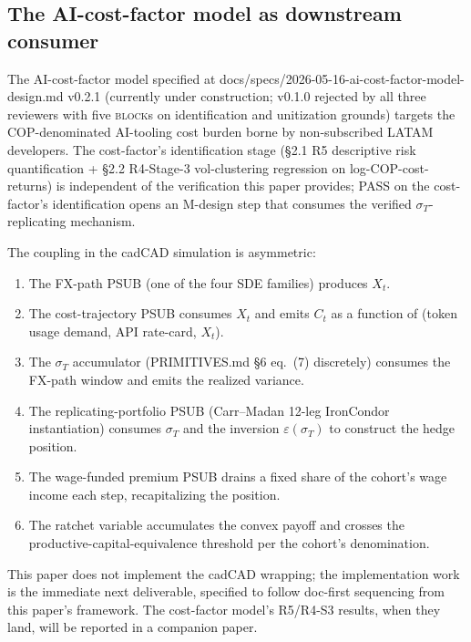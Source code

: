 \documentclass[11pt,letterpaper]{article}
\newcommand{\sigmaT}{\sigma_{T}}
\newcommand{\epsT}{\varepsilon(\sigmaT)}
\begin{document}
\subsection{The AI-cost-factor model as downstream consumer}
\label{sec:cadcad:cost-factor}

The AI-cost-factor model specified at
\textsf{docs/specs/2026-05-16-ai-cost-factor-model-design.md} v0.2.1
(currently under construction; v0.1.0 rejected by all three reviewers
with five \textsc{block}s on identification and unitization grounds)
targets the COP-denominated AI-tooling cost burden borne by
non-subscribed LATAM developers. The cost-factor's identification stage
(\S2.1 R5 descriptive risk quantification + \S2.2 R4-Stage-3 vol-clustering
regression on log-COP-cost-returns) is independent of the
verification this paper provides; PASS on the cost-factor's
identification opens an M-design step that consumes the verified
$\sigmaT$-replicating mechanism.

The coupling in the cadCAD simulation is asymmetric:
\begin{enumerate}
    \item The FX-path PSUB (one of the four SDE families) produces $X_t$.
    \item The cost-trajectory PSUB consumes $X_t$ and emits $C_t$ as a
        function of (token usage demand, API rate-card, $X_t$).
    \item The $\sigmaT$ accumulator (PRIMITIVES.md \S6 eq.~(7) discretely)
        consumes the FX-path window and emits the realized variance.
    \item The replicating-portfolio PSUB (Carr--Madan 12-leg IronCondor
        instantiation) consumes $\sigmaT$ and the inversion
        $\epsT$ to construct the hedge position.
    \item The wage-funded premium PSUB drains a fixed share of the
        cohort's wage income each step, recapitalizing the position.
    \item The ratchet variable accumulates the convex payoff and crosses
        the productive-capital-equivalence threshold per the cohort's
        denomination.
\end{enumerate}

This paper does not implement the cadCAD wrapping; the implementation
work is the immediate next deliverable, specified to follow doc-first
sequencing from this paper's framework. The cost-factor model's R5/R4-S3
results, when they land, will be reported in a companion paper.
\end{document}
